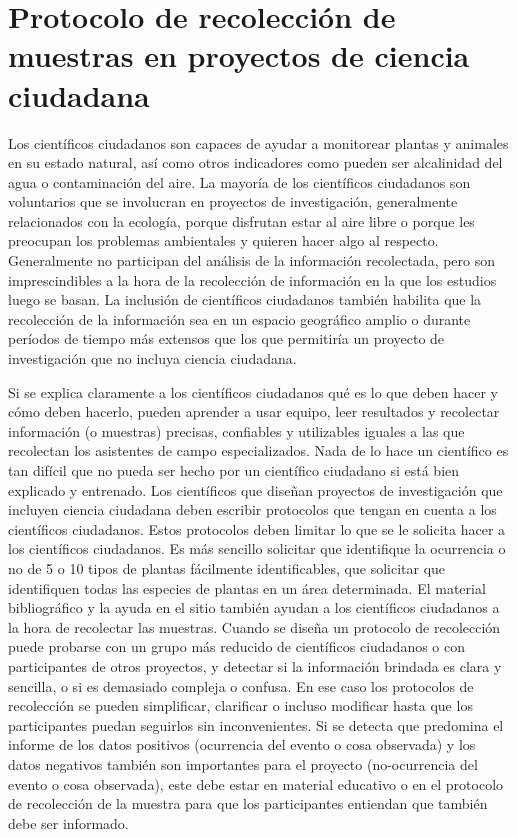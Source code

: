 \section{Protocolo de recolección de muestras en proyectos de ciencia ciudadana}

	Los científicos ciudadanos son capaces de ayudar a monitorear plantas y animales en su estado natural, así como otros indicadores como pueden ser alcalinidad del agua o contaminación del aire. La mayoría de los científicos ciudadanos son voluntarios que se involucran en proyectos de investigación, generalmente relacionados con la ecología, porque disfrutan estar al aire libre o porque les preocupan los problemas ambientales y quieren hacer algo al respecto. Generalmente no participan del análisis de la información recolectada, pero son imprescindibles a la hora de la recolección de información en la que los estudios luego se basan. La inclusión de científicos ciudadanos también habilita que la recolección de la información sea en un espacio geográfico amplio o durante períodos de tiempo más extensos que los que permitiría un proyecto de investigación que no incluya ciencia ciudadana.
	
	Si se explica claramente a los científicos ciudadanos qué es lo que deben hacer y cómo deben hacerlo, pueden aprender a usar equipo, leer resultados y recolectar información (o muestras) precisas, confiables y utilizables iguales a las que recolectan los asistentes de campo especializados. Nada de lo hace un científico es tan difícil que no pueda ser hecho por un científico ciudadano si está bien explicado y entrenado. Los científicos que diseñan proyectos de investigación que incluyen ciencia ciudadana deben escribir protocolos que tengan en cuenta a los científicos ciudadanos. Estos protocolos deben limitar lo que se le solicita hacer a los científicos ciudadanos. Es más sencillo solicitar que identifique la ocurrencia o no de 5 o 10 tipos de plantas fácilmente identificables, que solicitar que identifiquen todas las especies de plantas en un área determinada. El material bibliográfico y la ayuda en el sitio también ayudan a los científicos ciudadanos a la hora de recolectar las muestras.\cite{cohn2008citizen} Cuando se diseña un protocolo de recolección puede probarse con un grupo más reducido de científicos ciudadanos o con participantes de otros proyectos, y detectar si la información brindada es clara y sencilla, o si es demasiado compleja o confusa. En ese caso los protocolos de recolección se pueden simplificar, clarificar o incluso modificar hasta que los participantes puedan seguirlos sin inconvenientes. Si se detecta que predomina el informe de los datos positivos (ocurrencia del evento o cosa observada) y los datos negativos también son importantes para el proyecto (no-ocurrencia del evento o cosa observada), este debe estar en material educativo o en el protocolo de recolección de la muestra para que los participantes entiendan que también debe ser informado.\cite{bonney2009citizen}
	
